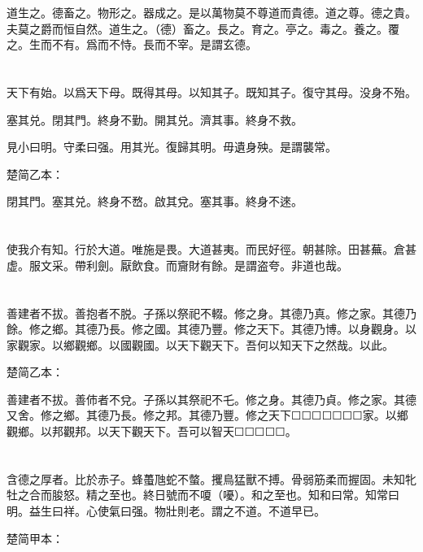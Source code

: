 \documentclass[a5paper]{ctexbook}
\begin{document}
    道生之。德畜之。物形之。器成之。是以萬物莫不尊道而貴德。道之尊。德之貴。夫莫之爵而恒自然。道生之。（德）畜之。長之。育之。亭之。毒之。養之。覆之。生而不有。爲而不恃。長而不宰。是謂玄德。

    \chapter{}

    天下有始。以爲天下母。既得其母。以知其子。既知其子。復守其母。没身不殆。
    
    塞其兑。閉其門。終身不勤。開其兑。濟其事。終身不救。
    
    見小曰明。守柔曰强。用其光。復歸其明。毋遺身殃。是謂襲常。

    楚简乙本：

    閉其門。塞其兑。終身不嵍。啟其兌。塞其事。終身不逨。

    \chapter{}

    使我介有知。行於大道。唯施是畏。大道甚夷。而民好徑。朝甚除。田甚蕪。倉甚虚。服文采。帶利劍。厭飲食。而齎財有餘。是謂盗夸。非道也哉。

    \chapter{}

    善建者不拔。善抱者不脱。子孫以祭祀不輟。修之身。其德乃真。修之家。其德乃餘。修之鄉。其德乃長。修之國。其德乃豐。修之天下。其德乃博。以身觀身。以家觀家。以鄉觀鄉。以國觀國。以天下觀天下。吾何以知天下之然哉。以此。

    楚简乙本：

    善建者不拔。善伂者不兌。子孫以其祭祀不乇。修之身。其德乃貞。修之家。其德又舍。修之鄉。其德乃長。修之邦。其德乃豐。修之天下☐☐☐☐☐☐☐家。以鄉觀鄉。以邦觀邦。以天下觀天下。吾可以智天☐☐☐☐☐。

    \chapter{}

    含德之厚者。比於赤子。蜂蠆虺蛇不螫。攫鳥猛獸不搏。骨弱筋柔而握固。未知牝牡之合而朘怒。精之至也。終日號而不嗄（嚘）。和之至也。知和曰常。知常曰明。益生曰祥。心使氣曰强。物壯則老。謂之不道。不道早已。

    楚简甲本：
\end{document}
